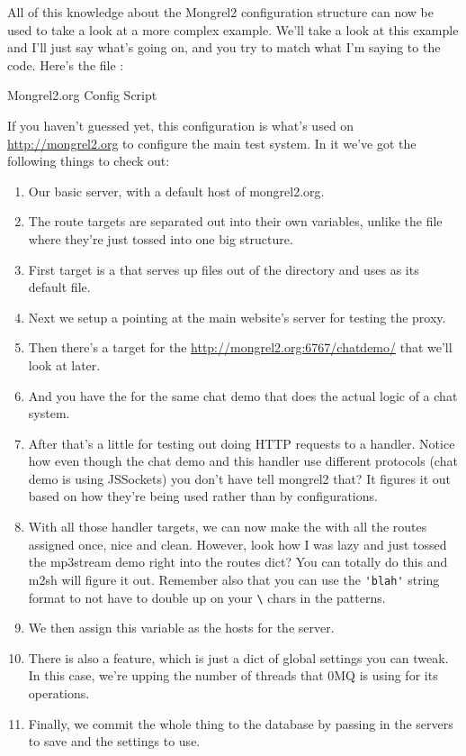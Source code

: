 All of this knowledge about the Mongrel2 configuration structure can now be used to take a look at
a more complex example.  We'll take a look at this example and I'll just say what's
going on, and you try to match what I'm saying to the code.  Here's the file :

\begin{code}{Mongrel2.org Config Script}
  
\end{code}

If you haven't guessed yet, this configuration is what's used on \url{http://mongrel2.org}
to configure the main test system.  In it we've got the following things to check out:

\begin{enumerate}
\item Our basic server, with a default host of mongrel2.org.
\item The route targets are separated out into their own variables, unlike the  file
    where they're just tossed into one big structure.
\item First target is a  that serves up files out of the  directory and uses 
    as its default file.
\item Next we setup a  pointing at the main website's server for testing the proxy.
\item Then there's a  target for the \url{http://mongrel2.org:6767/chatdemo/} that we'll look at later.
\item And you have the  for the same chat demo that does the actual logic of a chat system.
\item After that's a little  for testing out doing HTTP requests to a handler.  Notice how even
    though the chat demo and this handler use different protocols (chat demo is using JSSockets) you don't have
    tell mongrel2 that?  It figures it out based on how they're being used rather than by configurations.
\item With all those handler targets, we can now make the   with all the routes
    assigned once, nice and clean.  However, look how I was lazy and just tossed the mp3stream demo
    right into the routes dict?  You can totally do this and m2sh will figure it out.  Remember also that
    you can use the \verb|'blah'| string format to not have to double up on your \verb|\| chars in the patterns.
\item We then assign this  variable as the hosts for the  server.
\item There is also a  feature, which is just a dict of global settings you can tweak.  In this case,
    we're upping the number of threads that 0MQ is using for its operations.
\item Finally, we commit the whole thing to the database by passing in the servers to save and the settings
    to use.
\end{enumerate}

